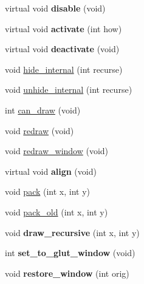 \begin{DoxyCompactItemize}
\item 
\hypertarget{classGLUI__Control_aa0f11adca623c75aae9690052047e06d}{virtual void {\bfseries disable} (void)}\label{classGLUI__Control_aa0f11adca623c75aae9690052047e06d}

\item 
\hypertarget{classGLUI__Control_af686704718daf4761d17e4da83c03aad}{virtual void {\bfseries activate} (int how)}\label{classGLUI__Control_af686704718daf4761d17e4da83c03aad}

\item 
\hypertarget{classGLUI__Control_a9d18764a6cfe25c220c845eff480d4fe}{virtual void {\bfseries deactivate} (void)}\label{classGLUI__Control_a9d18764a6cfe25c220c845eff480d4fe}

\item 
void \hyperlink{classGLUI__Control_ae88270c442111baddf290f4a153caed1}{hide\-\_\-internal} (int recurse)
\item 
void \hyperlink{classGLUI__Control_a73192b0fdcaa75eb04d43fa70abe246f}{unhide\-\_\-internal} (int recurse)
\item 
int \hyperlink{classGLUI__Control_add5d7aa8efcd213181cf84975661e168}{can\-\_\-draw} (void)
\item 
void \hyperlink{classGLUI__Control_a7777125cd866884377899df625bad6cd}{redraw} (void)
\item 
void \hyperlink{classGLUI__Control_aecb4bacd8f4ff12de6ffcecc166d3adc}{redraw\-\_\-window} (void)
\item 
\hypertarget{classGLUI__Control_a54f010ee55d9623325126868677e9e3b}{virtual void {\bfseries align} (void)}\label{classGLUI__Control_a54f010ee55d9623325126868677e9e3b}

\item 
void \hyperlink{classGLUI__Control_a55b244224a7446e7254a9d3b468d4925}{pack} (int x, int y)
\item 
void \hyperlink{classGLUI__Control_a1c9cf8a504998db2393c4d45144eca8d}{pack\-\_\-old} (int x, int y)
\item 
\hypertarget{classGLUI__Control_af151f23a66652c7be4a49320d49a3aab}{void {\bfseries draw\-\_\-recursive} (int x, int y)}\label{classGLUI__Control_af151f23a66652c7be4a49320d49a3aab}

\item 
\hypertarget{classGLUI__Control_aff3f98acd4b58ba0db35b5889c4006bc}{int {\bfseries set\-\_\-to\-\_\-glut\-\_\-window} (void)}\label{classGLUI__Control_aff3f98acd4b58ba0db35b5889c4006bc}

\item 
\hypertarget{classGLUI__Control_a49e4d3f46873d156162d9f770b7b3832}{void {\bfseries restore\-\_\-window} (int orig)}\label{classGLUI__Control_a49e4d3f46873d156162d9f770b7b3832}


\end{DoxyCompactItemize}

